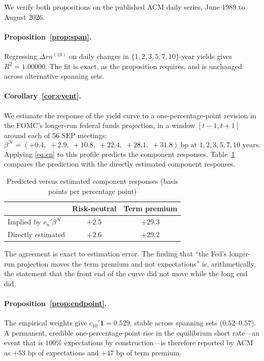 \documentclass[11pt]{article}
\theoremstyle{remark}\newtheorem{remark}{Remark}
\begin{document}
We verify both propositions on the published ACM daily series, June 1989 to August 2026.

\paragraph{Proposition~\ref{prop:span}.} Regressing $\Delta rn^{(10)}$ on daily changes in $\{1,2,3,5,7,10\}$-year yields gives $R^2=1.00000$. The fit is exact, as the proposition requires, and is unchanged across alternative spanning sets.

\paragraph{Corollary~\ref{cor:event}.} We estimate the response of the yield curve to a one-percentage-point revision in the FOMC's longer-run federal funds projection, in a window $[t-1,t+1]$ around each of 56 SEP meetings:
\[
\beta^{\mathcal N}=(+0.4,\;+2.9,\;+10.8,\;+22.4,\;+28.1,\;+31.8)\ \text{bp at }1,2,3,5,7,10\text{ years}.
\]
Applying \eqref{eq:cn} to this profile predicts the component responses. Table~\ref{tab:one} compares the prediction with the directly estimated component responses.

\begin{table}[h]\centering
\caption{Predicted versus estimated component responses (basis points per percentage point)}\label{tab:one}
\begin{tabular}{lcc}
\toprule
& Risk-neutral & Term premium\\
\midrule
Implied by $c_n'\beta^{\mathcal N}$ &$+2.5$ & $+29.3$\\
Directly estimated & $+2.6$ & $+29.2$\\
\bottomrule
\end{tabular}
\end{table}

\noindent The agreement is exact to estimation error. The finding that ``the Fed's longer-run projection moves the term premium and not expectations'' is, arithmetically, the statement that the front end of the curve did not move while the long end did.

\paragraph{Proposition~\ref{prop:endpoint}.} The empirical weights give $c_{10}'\boldsymbol{1}=0.529$, stable across spanning sets ($0.52$--$0.57$). A permanent, credible one-percentage-point rise in the equilibrium short rate---an event that is $100\%$ expectations by construction---is therefore reported by ACM as $+53$ bp of expectations and $+47$ bp of term premium.
\end{document}
